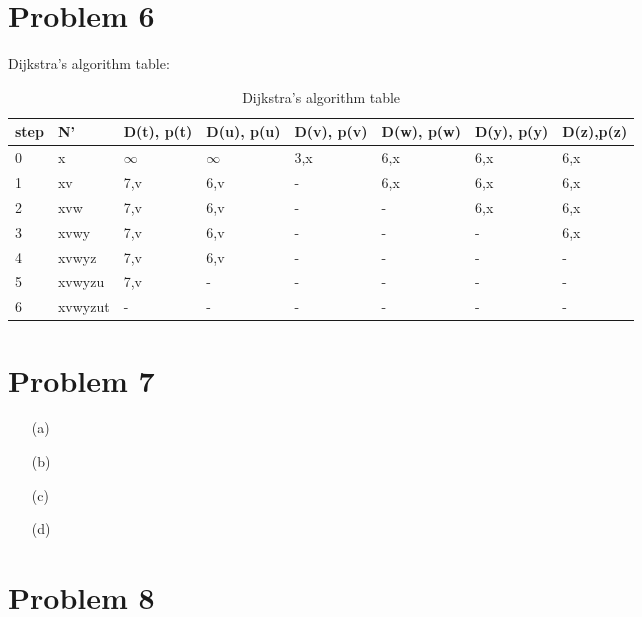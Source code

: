 \documentclass[12pt,a4paper]{article}
\begin{document}
\section*{Problem 6}
Dijkstra's algorithm table:
\begin{table}[!ht]
    \centering
    \begin{tabular}{|l|l|l|l|l|l|l|l|}
    \hline
        step & N' & D(t), p(t) & D(u), p(u) & D(v), p(v) & D(w), p(w) & D(y), p(y) & D(z),p(z) \\ \hline
        0 & x & $\infty$ & $\infty$ & 3,x & 6,x & 6,x & 6,x \\ \hline
        1 & xv & 7,v & 6,v & - & 6,x & 6,x & 6,x \\ \hline
        2 & xvw & 7,v & 6,v & - & - & 6,x & 6,x \\ \hline
        3 & xvwy & 7,v & 6,v & - & - & - & 6,x \\ \hline
        4 & xvwyz & 7,v & 6,v & - & - & - & - \\ \hline
        5 & xvwyzu & 7,v & - & - & - & - & - \\ \hline
        6 & xvwyzut & - & - & - & - & - & - \\ \hline
    \end{tabular}
    \caption{Dijkstra's algorithm table}
\end{table}
\section*{Problem 7}

\begin{enumerate}
    \item [(a)] 
        
    \item[(b)]
        
    \item[(c)]
        
    \item[(d)]
        

\end{enumerate}

\section*{Problem 8}
\end{document}
